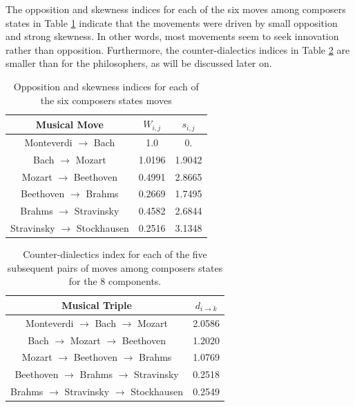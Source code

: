 \documentclass[
 aip,
 jmp,
 amsmath,amssymb,
 reprint,
]{revtex4-1}
\begin{document}
The opposition and skewness indices for each of the six moves among
composers states in Table \ref{tab:tableOImus} indicate that the
movements were driven by small opposition and strong skewness. In
other words, most movements seem to seek innovation rather than
opposition. Furthermore, the counter-dialectics indices in Table
\ref{tab:tableEmus} are smaller than for the philosophers, as will be
discussed later on.

\begin{table}[ht]
  \caption{\label{tab:tableOImus}Opposition and skewness indices for
    each of the six composers states moves}
  \begin{tabular}{|c||c|c|}
    \hline
    Musical Move & $W_{i,j}$ & $s_{i,j}$ \\
    \hline \hline
    Monteverdi $\to$ Bach             &   1.0     &  0.      \\
    Bach $\to$ Mozart                 &   1.0196  &  1.9042  \\
    Mozart $\to$ Beethoven            &   0.4991  &  2.8665  \\
    Beethoven $\to$ Brahms            &   0.2669  &  1.7495  \\
    Brahms $\to$ Stravinsky           &   0.4582  &  2.6844  \\
    Stravinsky $\to$ Stockhausen      &   0.2516  &  3.1348  \\
    \hline
  \end{tabular}
\end{table}

\begin{table}[ht]
  \caption{\label{tab:tableEmus} Counter-dialectics index for each of
    the five subsequent pairs of moves among composers states for the
    8 components.}
  \begin{tabular}{|c||c|}
    \hline
    Musical Triple & $d_{i \rightarrow k}$ \\
    \hline \hline
    Monteverdi $\to$ Bach $\to$ Mozart          & 2.0586 \\
    Bach $\to$ Mozart $\to$ Beethoven           & 1.2020 \\
    Mozart $\to$ Beethoven $\to$ Brahms         & 1.0769 \\
    Beethoven $\to$ Brahms $\to$ Stravinsky     & 0.2518 \\
    Brahms $\to$ Stravinsky $\to$ Stockhausen   & 0.2549 \\
    \hline
  \end{tabular}
\end{table}
\end{document}
